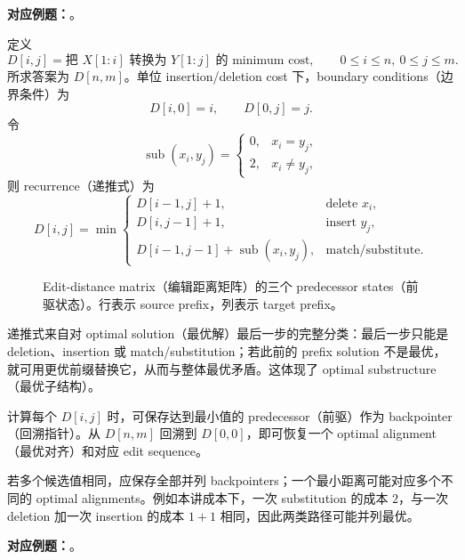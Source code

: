 \textbf{对应例题：}。


定义
\[
  D[i,j]
  =\text{把 }X[1{:}i]\text{ 转换为 }Y[1{:}j]\text{ 的 minimum cost},
  \qquad 0\le i\le n,\ 0\le j\le m.
\]
所求答案为 $D[n,m]$。单位 insertion/deletion cost 下，boundary conditions（边界条件）为
\[
  D[i,0]=i,\qquad D[0,j]=j.
\]
令
\[
  \operatorname{sub}(x_i,y_j)=
  \begin{cases}
    0, & x_i=y_j,\\
    2, & x_i\ne y_j,
  \end{cases}
\]
则 recurrence（递推式）为
\[
  D[i,j]=\min\!\begin{cases}
    D[i-1,j]+1, & \text{delete }x_i,\\
    D[i,j-1]+1, & \text{insert }y_j,\\
    D[i-1,j-1]+\operatorname{sub}(x_i,y_j),
      & \text{match/substitute}.
  \end{cases}
\]

\begin{figure}[htbp]
  \centering
  \resizebox{0.86\textwidth}{!}{}
  \caption{Edit-distance matrix（编辑距离矩阵）的三个 predecessor states（前驱状态）。行表示 source prefix，列表示 target prefix。}
  \label{fig:sc4002-l03-predecessors}
\end{figure}

递推式来自对 optimal solution（最优解）最后一步的完整分类：最后一步只能是 deletion、insertion 或 match/substitution；若此前的 prefix solution 不是最优，就可用更优前缀替换它，从而与整体最优矛盾。这体现了 optimal substructure（最优子结构）。


计算每个 $D[i,j]$ 时，可保存达到最小值的 predecessor（前驱）作为 backpointer（回溯指针）。从 $D[n,m]$ 回溯到 $D[0,0]$，即可恢复一个 optimal alignment（最优对齐）和对应 edit sequence。

若多个候选值相同，应保存全部并列 backpointers；一个最小距离可能对应多个不同的 optimal alignments。例如本讲成本下，一次 substitution 的成本 $2$，与一次 deletion 加一次 insertion 的成本 $1+1$ 相同，因此两类路径可能并列最优。

\textbf{对应例题：}。


